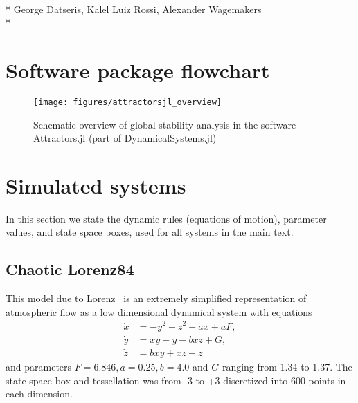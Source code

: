 \documentclass[preprint,superscriptaddress,
nofootinbib,amsmath,amssymb,aps]{revtex4-1}
\begin{document}
\hspace{-0.5cm}{\large Supplementary information for: Framework for global stability analysis of dynamical systems}\\*
George Datseris, Kalel Luiz Rossi, Alexander Wagemakers\\*

\nopagebreak
\section{Software package flowchart}

\begin{figure*}[!h]
\centering 
\texttt{[image: figures/attractorsjl\_overview]}
\caption{Schematic overview of global stability analysis in the software Attractors.jl (part of DynamicalSystems.jl)}
\label{fig:continuation_algorithm}
\end{figure*}


\section{Simulated systems}
In this section we state the dynamic rules (equations of motion), parameter values, and state space boxes, used for all systems in the main text.

\subsection*{Chaotic Lorenz84} This model due to Lorenz~\cite{Lorenz84} is an extremely simplified representation of atmospheric flow as a low dimensional dynamical system with equations
\begin{align*}
\dot x &= - y^2 - z^2 - ax + aF, \\
\dot y &= xy - y - bxz + G, \\
\dot z &= bxy + xz - z
\end{align*}
and parameters $F=6.846, a=0.25, b=4.0$ and $G$ ranging from 1.34 to 1.37. The state space box and tessellation was from -3 to +3 discretized into 600 points in each dimension.
\end{document}
